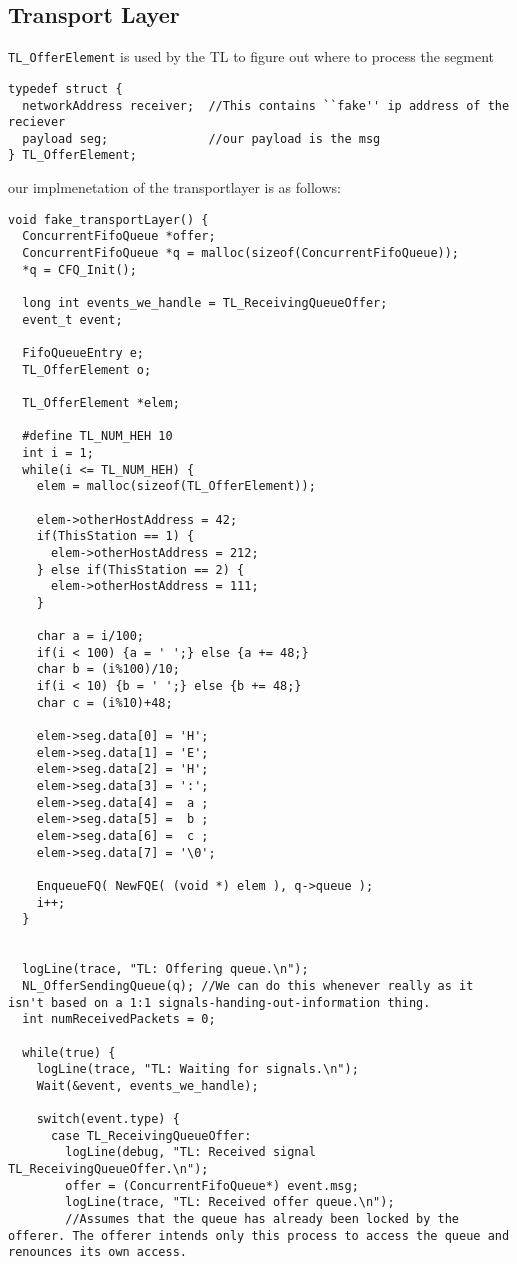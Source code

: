 \subsection{Transport Layer}

\texttt{TL\_OfferElement} is used by the TL to figure out where to process the segment
\begin{lstlisting}
typedef struct {
  networkAddress receiver;  //This contains ``fake'' ip address of the reciever
  payload seg;              //our payload is the msg
} TL_OfferElement;
\end{lstlisting}
\break

our implmenetation of the transportlayer is as follows:

\begin{lstlisting}
void fake_transportLayer() {
  ConcurrentFifoQueue *offer;
  ConcurrentFifoQueue *q = malloc(sizeof(ConcurrentFifoQueue));
  *q = CFQ_Init();

  long int events_we_handle = TL_ReceivingQueueOffer;
  event_t event;

  FifoQueueEntry e;
  TL_OfferElement o;

  TL_OfferElement *elem;

  #define TL_NUM_HEH 10
  int i = 1;
  while(i <= TL_NUM_HEH) {
    elem = malloc(sizeof(TL_OfferElement));

    elem->otherHostAddress = 42;
    if(ThisStation == 1) {
      elem->otherHostAddress = 212;
    } else if(ThisStation == 2) {
      elem->otherHostAddress = 111;
    }

    char a = i/100;
    if(i < 100) {a = ' ';} else {a += 48;}
    char b = (i%100)/10;
    if(i < 10) {b = ' ';} else {b += 48;}
    char c = (i%10)+48;

    elem->seg.data[0] = 'H';
    elem->seg.data[1] = 'E';
    elem->seg.data[2] = 'H';
    elem->seg.data[3] = ':';
    elem->seg.data[4] =  a ;
    elem->seg.data[5] =  b ;
    elem->seg.data[6] =  c ;
    elem->seg.data[7] = '\0';

    EnqueueFQ( NewFQE( (void *) elem ), q->queue );
    i++;
  }


  logLine(trace, "TL: Offering queue.\n");
  NL_OfferSendingQueue(q); //We can do this whenever really as it isn't based on a 1:1 signals-handing-out-information thing.
  int numReceivedPackets = 0;

  while(true) {
    logLine(trace, "TL: Waiting for signals.\n");
    Wait(&event, events_we_handle);

    switch(event.type) {
      case TL_ReceivingQueueOffer:
        logLine(debug, "TL: Received signal TL_ReceivingQueueOffer.\n");
        offer = (ConcurrentFifoQueue*) event.msg;
        logLine(trace, "TL: Received offer queue.\n");
        //Assumes that the queue has already been locked by the offerer. The offerer intends only this process to access the queue and renounces its own access.


\end{lstlisting}
